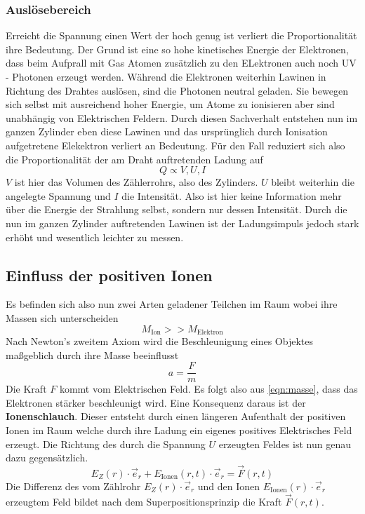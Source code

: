 \subsubsection{Auslösebereich}
Erreicht die Spannung einen Wert der hoch genug ist verliert die Proportionalität ihre Bedeutung. 
Der Grund ist eine so hohe kinetisches Energie der Elektronen, dass beim Aufprall mit Gas Atomen zusätzlich zu den ELektronen auch noch UV - Photonen erzeugt werden. 
Während die Elektronen weiterhin Lawinen 
in Richtung des Drahtes auslösen, sind die Photonen neutral geladen. Sie bewegen sich selbst mit ausreichend hoher Energie, um Atome zu ionisieren aber sind unabhängig von 
Elektrischen Feldern. Durch diesen Sachverhalt entstehen nun im ganzen Zylinder eben diese Lawinen und das ursprünglich durch Ionisation aufgetretene Elekektron verliert an Bedeutung.
Für den Fall reduziert sich also die Proportionalität der am Draht auftretenden Ladung auf
\begin{equation*}
\label{eqn:prop3}
Q \propto V, U, I
\end{equation*}
$V$ ist hier das Volumen des Zählerrohrs, also des Zylinders. $U$ bleibt weiterhin die angelegte Spannung und $I$ die Intensität.
Also ist hier keine Information mehr über die Energie der Strahlung selbst, sondern nur dessen Intensität.
Durch die nun im ganzen Zylinder auftretenden Lawinen ist der Ladungsimpuls jedoch stark erhöht und wesentlich leichter zu messen.

\subsection{Einfluss der positiven Ionen}
Es befinden sich also nun zwei Arten geladener Teilchen im Raum wobei ihre Massen sich unterscheiden
\begin{equation*}
\label{eqn:masse}
M_\text{Ion} >> M_\text{Elektron}
\end{equation*}
Nach Newton's zweitem Axiom wird die Beschleunigung eines Objektes maßgeblich durch ihre Masse beeinflusst
\begin{equation*}
\label{eqn:masse}
a= \frac{F}{m}
\end{equation*}
Die Kraft $F$ kommt vom Elektrischen Feld. Es folgt also aus \eqref{eqn:masse}, dass das Elektronen stärker beschleunigt wird. Eine Konsequenz daraus ist der \textbf{Ionenschlauch}. Dieser entsteht
durch einen längeren Aufenthalt der positiven Ionen im Raum welche durch ihre Ladung ein eigenes positives Elektrisches Feld erzeugt. Die Richtung des durch die Spannung $U$ erzeugten Feldes ist nun genau dazu gegensätzlich.
\begin{equation*}
\label{eqn:Felder}
E_Z(r)\cdot \vec{e}_r + E_\text{Ionen}(r,t) \cdot \vec{e}_r = \vec{F}(r,t)
\end{equation*}
Die Differenz des vom Zählrohr $E_Z(r)\cdot \vec{e}_r$ und den Ionen $E_\text{Ionen}(r) \cdot \vec{e}_r$ erzeugtem Feld bildet nach dem Superpositionsprinzip  die Kraft $\vec{F}(r,t)$.

